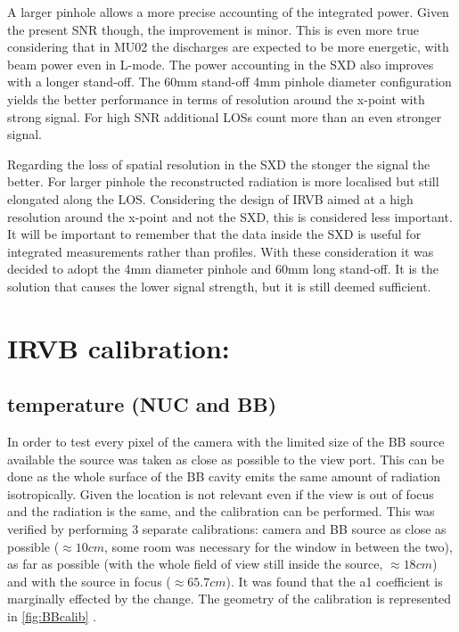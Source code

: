 A larger pinhole allows a more precise accounting of the integrated power. Given the present SNR though, the improvement is minor. This is even more true considering that in MU02 the discharges are expected to be more energetic, with beam power even in L-mode. The power accounting in the SXD also improves with a longer stand-off.
The 60mm stand-off 4mm pinhole diameter configuration yields the better performance in terms of resolution around the x-point with strong signal. For high SNR additional LOSs count more than an even stronger signal.

Regarding the loss of spatial resolution in the SXD the stonger the signal the better. For larger pinhole the reconstructed radiation is more localised but still elongated along the LOS. Considering the design of IRVB aimed at a high resolution around the x-point and not the SXD, this is considered less important. It will be important to remember that the data inside the SXD is useful for integrated measurements rather than profiles.
With these consideration it was decided to adopt the 4mm diameter pinhole and 60mm long stand-off. It is the solution that causes the lower signal strength, but it is still deemed sufficient.

\section{IRVB calibration:}
\subsection{temperature (NUC and BB)}

In order to test every pixel of the camera with the limited size of the BB source available the source was taken as close as possible to the view port. This can be done as the whole surface of the BB cavity emits the same amount of radiation isotropically. Given the location is not relevant even if the view is out of focus and the radiation is the same, and the calibration can be performed. This was verified by performing 3 separate calibrations: camera and BB source as close as possible ($\approx 10cm$, some room was necessary for the window in between the two), as far as possible (with the whole field of view still inside the source, $\approx 18cm$) and with the source in focus ($\approx 65.7cm$). It was found that the a1 coefficient is marginally effected by the change.
The geometry of the calibration is represented in \autoref{fig:BBcalib} .

